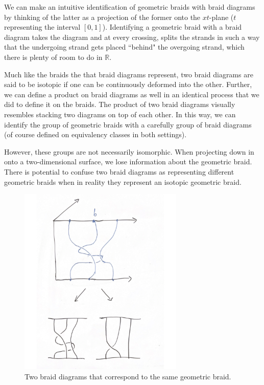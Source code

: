 \documentclass[10pt]{ucthesis}
\newcommand{\R}{\mathbb{R}}
\begin{document}
We can make an intuitive identification of geometric braids with braid diagrams by thinking of the latter as a projection of the former onto the $xt$-plane ($t$ representing the interval $[0,1]$). Identifying a geometric braid with a braid diagram takes the diagram and at every crossing, splits the strands in such a way that the undergoing strand gets placed ``behind" the overgoing strand, which there is plenty of room to do in $\R$.

Much like the braids the that braid diagrams represent, two braid diagrams are said to be isotopic if one can be continuously deformed into the other. Further, we can define a product on braid diagrams as well in an identical process that we did to define it on the braids. The product of two braid diagrams visually resembles stacking two diagrams on top of each other. In this way, we can  identify the group of geometric braids with a carefully group of braid diagrams (of course defined on equivalency classes in both settings). 

However, these groups are not necessarily isomorphic. When projecting down in onto a two-dimensional surface, we lose information about the geometric braid. There is potential to confuse two braid diagrams as representing different geometric braids when in reality they represent an isotopic geometric braid.

\begin{figure}[H]
	\centering
	\includegraphics[width=0.7\textwidth]{requiv.png}
	\caption{Two braid diagrams that correspond to the same geometric braid.}
\end{figure}
\end{document}

